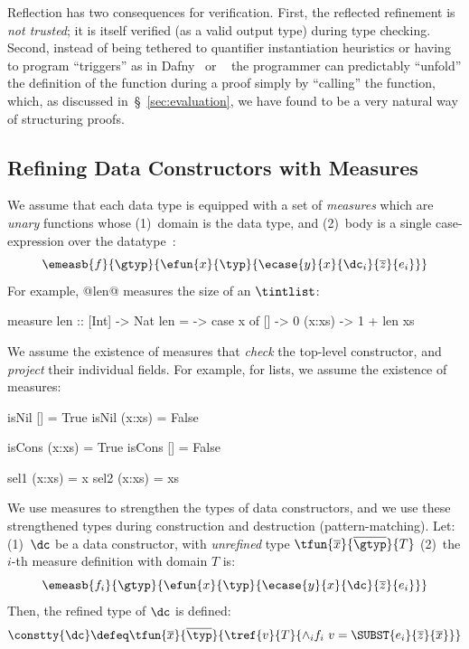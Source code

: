 %
Reflection has two consequences for verification.
%
First, the reflected refinement is \emph{not trusted};
it is itself verified (as a valid output type)
during type checking.
%
Second, instead of being tethered to quantifier
instantiation heuristics or having to program
``triggers'' as in Dafny~\citep{dafny} or
\fstar~\citep{fstar}
%
the programmer can predictably ``unfold'' the
definition of the function during a proof simply
by ``calling'' the function, which, as discussed
in~\S~\ref{sec:evaluation}, we have found to be
a very natural way of structuring proofs.


\subsection{Refining Data Constructors with Measures}
\label{subsec:measures}
\label{subsec:list}

We assume that each data type is equipped with
a set of \emph{measures} which are \emph{unary}
functions whose (1)~domain is the data type, and
(2)~body is a single case-expression over the
datatype~\cite{Vazou14}:
%
$$\emeasb{f}
         {\gtyp}
         {\efun{x}{\typ}{\ecase{y}{x}{\dc_i}{\overline{z}}{e_i}}}$$
%
For example, @len@ measures the size of an $\tintlist$:
%
\begin{code}
  measure len :: [Int] -> Nat
  len = \x -> case x of
                []     -> 0
                (x:xs) -> 1 + len xs
\end{code}

%
We assume the existence of measures that
\emph{check} the top-level constructor,
and \emph{project} their individual fields.
%
For example, for lists, we assume the existence of measures:
%
\begin{code}
  isNil []      = True
  isNil (x:xs)  = False

  isCons (x:xs) = True
  isCons []     = False

  sel1 (x:xs)   = x
  sel2 (x:xs)   = xs
\end{code}

%
We use measures to strengthen the types
of data constructors, and we use these
strengthened types during construction
and destruction (pattern-matching).
%
Let:
%
(1)~$\dc$ be a data constructor,
   with \emph{unrefined} type
   $\tfun{\overline{x}}{\overline{\gtyp}}{T}$
%
(2)~the $i$-th measure definition with
   domain $T$ is:
%
$$\emeasb{f_i}
         {\gtyp}
         {\efun{x}{\typ}{\ecase{y}{x}{\dc}{\overline{z}}{e_{i}}}}
$$
%
Then, the refined type of $\dc$ is defined:
$$
\constty{\dc} \defeq
   \tfun{\overline{x}}
        {\overline{\typ}}
        {\tref{v}{T}{ \wedge_i f_i\ v = \SUBST{e_{i}}{\overline{z}}{\overline{x}}}}
$$

